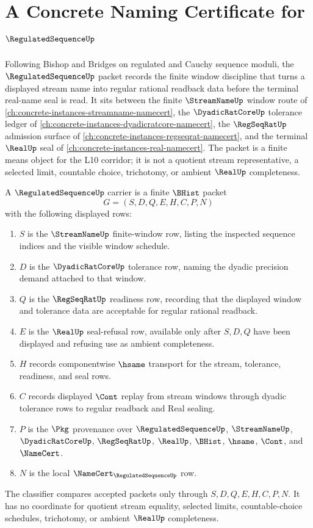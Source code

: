 \chapter{A Concrete Naming Certificate for $\RegulatedSequenceUp$}
\label{ch:concrete-instances-regulated-sequence-namecert}

Following Bishop and Bridges on regulated and Cauchy sequence moduli, the $\RegulatedSequenceUp$ packet records the finite window discipline that turns a displayed stream name into regular rational readback data before the terminal real-name seal is read. It sits between the finite $\StreamNameUp$ window route of \autoref{ch:concrete-instances-streamname-namecert}, the $\DyadicRatCoreUp$ tolerance ledger of \autoref{ch:concrete-instances-dyadicratcore-namecert}, the $\RegSeqRatUp$ admission surface of \autoref{ch:concrete-instances-regseqrat-namecert}, and the terminal $\RealUp$ seal of \autoref{ch:concrete-instances-real-namecert}. The packet is a finite means object for the L10 corridor; it is not a quotient stream representative, a selected limit, countable choice, trichotomy, or ambient $\RealUp$ completeness.

\begin{definition}
\label{def:regulated-sequence-carrier}
A $\RegulatedSequenceUp$ carrier is a finite $\BHist$ packet
$$
G=(S,D,Q,E,H,C,P,N)
$$
with the following displayed rows:
\begin{enumerate}
\item $S$ is the $\StreamNameUp$ finite-window row, listing the inspected sequence indices and the visible window schedule.
\item $D$ is the $\DyadicRatCoreUp$ tolerance row, naming the dyadic precision demand attached to that window.
\item $Q$ is the $\RegSeqRatUp$ readiness row, recording that the displayed window and tolerance data are acceptable for regular rational readback.
\item $E$ is the $\RealUp$ seal-refusal row, available only after $S,D,Q$ have been displayed and refusing use as ambient completeness.
\item $H$ records componentwise $\hsame$ transport for the stream, tolerance, readiness, and seal rows.
\item $C$ records displayed $\Cont$ replay from stream windows through dyadic tolerance rows to regular readback and Real sealing.
\item $P$ is the $\Pkg$ provenance over $\RegulatedSequenceUp$, $\StreamNameUp$, $\DyadicRatCoreUp$, $\RegSeqRatUp$, $\RealUp$, $\BHist$, $\hsame$, $\Cont$, and $\NameCert$.
\item $N$ is the local $\NameCert_{\RegulatedSequenceUp}$ row.
\end{enumerate}
The classifier compares accepted packets only through $S,D,Q,E,H,C,P,N$. It has no coordinate for quotient stream equality, selected limits, countable-choice schedules, trichotomy, or ambient $\RealUp$ completeness.
\end{definition}

